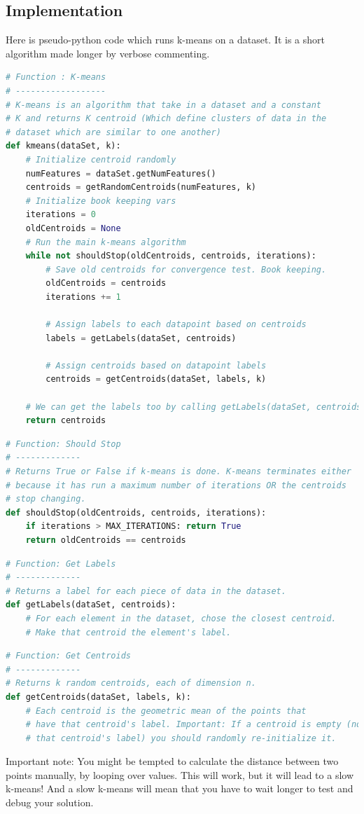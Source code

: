 \documentclass[10pt,letterpaper]{article}
\begin{document}
\subsection{Implementation}
Here is pseudo-python code which runs k-means on a dataset. It is a short algorithm made longer by verbose commenting.
\begin{lstlisting}[language=Python, caption=K-means Pseudo]
# Function : K-means
# ------------------
# K-means is an algorithm that take in a dataset and a constant
# K and returns K centroid (Which define clusters of data in the 
# dataset which are similar to one another)
def kmeans(dataSet, k):
	# Initialize centroid randomly
	numFeatures = dataSet.getNumFeatures()
	centroids = getRandomCentroids(numFeatures, k)
	# Initialize book keeping vars
	iterations = 0
	oldCentroids = None
    # Run the main k-means algorithm
	while not shouldStop(oldCentroids, centroids, iterations):
		# Save old centroids for convergence test. Book keeping.
		oldCentroids = centroids
		iterations += 1
		
		# Assign labels to each datapoint based on centroids
		labels = getLabels(dataSet, centroids)
		
		# Assign centroids based on datapoint labels
		centroids = getCentroids(dataSet, labels, k)
		
	# We can get the labels too by calling getLabels(dataSet, centroids)
	return centroids	
\end{lstlisting}

\begin{lstlisting}[language=Python, caption=Should Stop Function Pseudo]
# Function: Should Stop
# -------------
# Returns True or False if k-means is done. K-means terminates either
# because it has run a maximum number of iterations OR the centroids
# stop changing.
def shouldStop(oldCentroids, centroids, iterations):
	if iterations > MAX_ITERATIONS: return True
	return oldCentroids == centroids
\end{lstlisting}

\begin{lstlisting}[language=Python, caption=Get Labels Function]
# Function: Get Labels
# -------------
# Returns a label for each piece of data in the dataset. 
def getLabels(dataSet, centroids):
	# For each element in the dataset, chose the closest centroid. 
	# Make that centroid the element's label.
\end{lstlisting}

\begin{lstlisting}[language=Python, caption=Get Centroid Function]
# Function: Get Centroids
# -------------
# Returns k random centroids, each of dimension n.
def getCentroids(dataSet, labels, k):
	# Each centroid is the geometric mean of the points that
	# have that centroid's label. Important: If a centroid is empty (no points have
	# that centroid's label) you should randomly re-initialize it.
\end{lstlisting}
Important note: You might be tempted to calculate the distance between two points manually, by looping over values. This will work, but it will lead to a slow k-means! And a slow k-means will mean that you have to wait longer to test and debug your solution.\\
\end{document}
